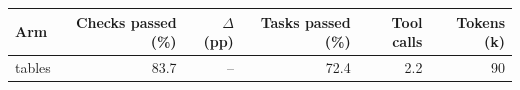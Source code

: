 \begin{tabular}{lrrrrr}
\toprule
Arm & Checks passed (\%) & $\Delta$ (pp) & Tasks passed (\%) & Tool calls & Tokens (k) \\
\midrule
tables & 83.7 & -- & 72.4 & 2.2 & 90 \\
\bottomrule
\end{tabular}
